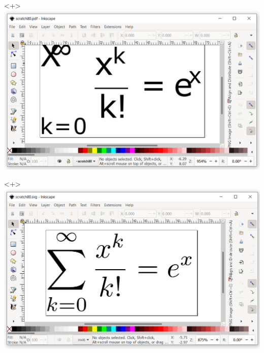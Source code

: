 \begin{frame}
    \centering

    \begin{onlyenv}<+>
        \includegraphics[width=\textwidth,height=0.8\textheight,keepaspectratio]{assets/document-loadinscape-aspdf.png}
    \end{onlyenv}
    \begin{onlyenv}<+>
        \includegraphics[width=\textwidth,height=0.8\textheight,keepaspectratio]{assets/document-loadinscape-assvg.png}
    \end{onlyenv}
\end{frame}

